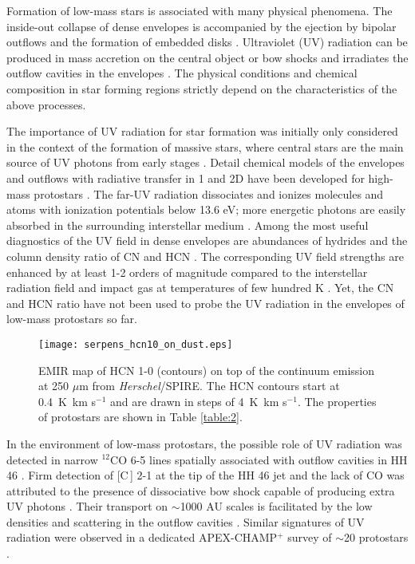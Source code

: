 \documentclass{aa}
\begin{document}
Formation of low-mass stars is associated with many physical phenomena. The inside-out collapse of dense envelopes
is accompanied by the ejection by bipolar outflows and the formation of embedded disks \citep{Fra14,Har15}.
Ultraviolet (UV) radiation can be produced in mass accretion on the central object or bow shocks and irradiates the outflow cavities 
in the envelopes \citep{Spa95,vKe09a}. The physical conditions and chemical 
composition in star forming regions strictly depend on the characteristics of the above processes. 

The importance of UV radiation for star formation was initially only considered in the context 
of the formation of massive stars, where central stars are the main source of UV photons from early stages \citep{Ces05,ZY07}. 
Detail chemical models of the envelopes and outflows with radiative transfer in 1 and 2D have been
developed for high-mass protostars \citep{DN97,Sta05,Bru07}. The far-UV radiation dissociates and ionizes molecules and
atoms with ionization potentials below 13.6 eV; more energetic photons are easily absorbed 
in the surrounding interstellar medium \citep{Ger16}. Among the most useful diagnostics
of the UV field in dense envelopes are abundances of hydrides and the column density ratio of CN and HCN \citep{Sta07}. 
The corresponding UV field strengths are enhanced by at least 1-2 orders of magnitude
compared to the interstellar radiation field and impact gas at temperatures of few hundred K \citep{Sta07,Ben16}. Yet, the CN and HCN ratio have not been used to probe the UV radiation in the envelopes of low-mass protostars so far.
\begin{figure} [tb]
\begin{center}
\texttt{[image: serpens\_hcn10\_on\_dust.eps]} 
\caption{EMIR map of HCN 1-0 (contours) on top of the continuum emission at 250 $\mu$m
from \textit{Herschel}/SPIRE. The HCN contours start at 0.4~K~km s$^{-1}$ and are drawn in steps 
of 4~K~km s$^{-1}$. The properties of protostars are shown in Table \ref{table:2}.} 
\label{seds} 
\end{center}
\end{figure}

In the environment of low-mass protostars, the possible role of UV radiation was detected in narrow $^{12}$CO 6-5 lines spatially associated with outflow cavities in HH 46 \citep{vKe09b}. 
Firm detection of [C{\,}] 2-1 at the tip of the HH 46 jet and the lack of CO was attributed 
to the presence of dissociative bow shock capable of producing extra UV photons \citep{ND89}. 
Their transport on $\sim$1000 AU scales is facilitated by the low densities and
scattering in the outflow cavities \citep{Spa95}. Similar signatures of UV radiation 
were observed in a dedicated APEX-CHAMP$^+$ survey of $\sim$20 protostars \citep{Yil12,Yil15}. 
\end{document}
